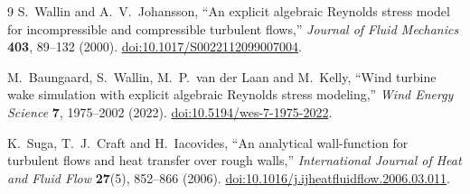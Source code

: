 \documentclass[11pt,a4paper]{article}
\numberwithin{equation}{section}
\begin{document}
\begin{thebibliography}{9}
S.~Wallin and A.~V.~Johansson,
``An explicit algebraic Reynolds stress model for incompressible and
compressible turbulent flows,''
\emph{Journal of Fluid Mechanics} \textbf{403}, 89--132 (2000).
\href{https://doi.org/10.1017/S0022112099007004}{doi:10.1017/S0022112099007004}.

M.~Baungaard, S.~Wallin, M.~P.~van der Laan and M.~Kelly,
``Wind turbine wake simulation with explicit algebraic Reynolds stress
modeling,'' \emph{Wind Energy Science} \textbf{7}, 1975--2002 (2022).
\href{https://doi.org/10.5194/wes-7-1975-2022}{doi:10.5194/wes-7-1975-2022}.

K.~Suga, T.~J.~Craft and H.~Iacovides,
``An analytical wall-function for turbulent flows and heat transfer over
rough walls,'' \emph{International Journal of Heat and Fluid Flow}
\textbf{27}(5), 852--866 (2006).
\href{https://doi.org/10.1016/j.ijheatfluidflow.2006.03.011}{doi:10.1016/j.ijheatfluidflow.2006.03.011}.
\end{thebibliography}
\end{document}
